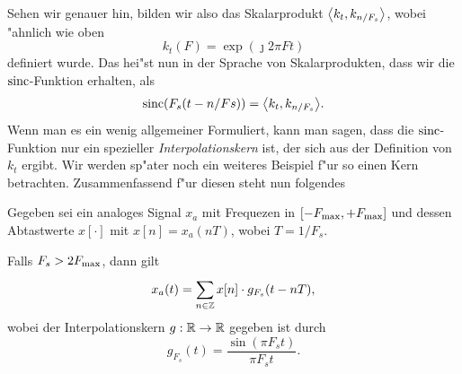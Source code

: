 Sehen wir genauer hin, bilden wir also das Skalarprodukt ${\left\langle k_t,k_{n/F_s} \right\rangle}$, wobei "ahnlich wie oben
\[
k_t(F) = \exp(\jmath 2 \pi F t)
\]
definiert wurde.
Das hei"st nun in der Sprache von Skalarprodukten, dass wir die $\operatorname*{sinc}$-Funktion erhalten, als
\[
    \operatorname*{sinc}(F_s (t - n/Fs)) = {\left\langle k_t,k_{n/F_s} \right\rangle}.
\]
Wenn man es ein wenig allgemeiner Formuliert, kann man sagen, dass die $\operatorname*{sinc}$-Funktion nur ein spezieller \emph{Interpolationskern} ist, der sich aus der Definition von $k_t$ ergibt.
Wir werden sp"ater noch ein weiteres Beispiel f"ur so einen Kern betrachten. Zusammenfassend f"ur diesen  steht nun folgendes
\begin{Thm}[Samplingtheorem]\label{stm:sampling_theorem}
Gegeben sei ein analoges Signal $x_a$ mit Frequezen in $[-F_{\rm max},+F_{\rm max}]$ und dessen Abtastwerte $x[\cdot]$ mit $x[n] = x_a(nT)$, wobei $T = 1/F_s$.

Falls $F_s > 2 F_{\rm max}$, dann gilt
\begin{equation}\label{eq:sampling_theorem}
    x_a(t) = {\sum\limits_{n \in \mathbb{Z}}^{}{
        x[n] \cdot g_{F_s}(t - n T),
    }}
\end{equation}
wobei der Interpolationskern $g : \mathbb{R} \rightarrow \mathbb{R}$ gegeben ist durch
\[
g_{F_s}(t) = \frac{\sin(\pi F_s t)}{\pi F_s t}.
\]
\end{Thm}

